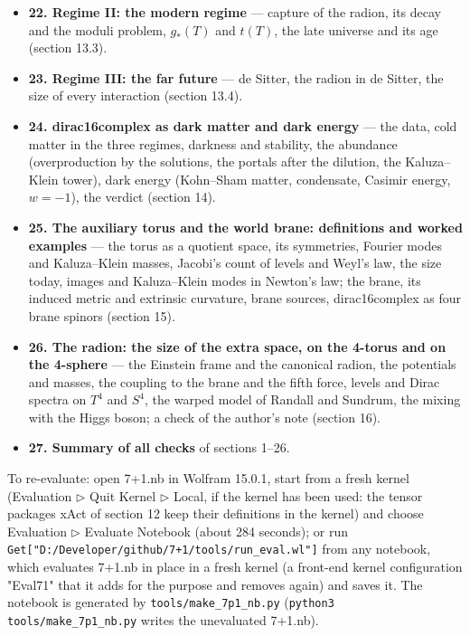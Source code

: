 \documentclass[10pt,a4paper]{article}
\begin{document}
\begin{itemize}
\item \textbf{22. Regime II: the modern regime} — capture of the radion, its decay and the moduli problem, $g_*(T)$ and $t(T)$, the late universe and its age (section 13.3).
\item \textbf{23. Regime III: the far future} — de Sitter, the radion in de Sitter, the size of every interaction (section 13.4).
\item \textbf{24. dirac16complex as dark matter and dark energy} — the data, cold matter in the three regimes, darkness and stability, the abundance (overproduction by the solutions, the portals after the dilution, the Kaluza–Klein tower), dark energy (Kohn–Sham matter, condensate, Casimir energy, $w=-1$), the verdict (section 14).
\item \textbf{25. The auxiliary torus and the world brane: definitions and worked examples} — the torus as a quotient space, its symmetries, Fourier modes and Kaluza–Klein masses, Jacobi’s count of levels and Weyl’s law, the size today, images and Kaluza–Klein modes in Newton’s law; the brane, its induced metric and extrinsic curvature, brane sources, dirac16complex as four brane spinors (section 15).
\item \textbf{26. The radion: the size of the extra space, on the 4-torus and on the 4-sphere} — the Einstein frame and the canonical radion, the potentials and masses, the coupling to the brane and the fifth force, levels and Dirac spectra on $T^4$ and $S^4$, the warped model of Randall and Sundrum, the mixing with the Higgs boson; a check of the author’s note (section 16).
\item \textbf{27. Summary of all checks} of sections 1–26.
\end{itemize}
To re-evaluate: open 7+1.nb in Wolfram 15.0.1, start from a fresh kernel (Evaluation \texorpdfstring{\ensuremath{\triangleright}}{▸} Quit Kernel \texorpdfstring{\ensuremath{\triangleright}}{▸} Local, if the kernel has been used: the tensor packages xAct of section 12 keep their definitions in the kernel) and choose Evaluation \texorpdfstring{\ensuremath{\triangleright}}{▸} Evaluate Notebook (about 284 seconds); or run \texttt{Get["D:/\allowbreak{}Developer/\allowbreak{}github/\allowbreak{}7+1/\allowbreak{}tools/\allowbreak{}run\_\allowbreak{}eval.wl"]} from any notebook, which evaluates 7+1.nb in place in a fresh kernel (a front-end kernel configuration "Eval71" that it adds for the purpose and removes again) and saves it. The notebook is generated by \texttt{tools/\allowbreak{}make\_\allowbreak{}7p1\_\allowbreak{}nb.py} (\texttt{python3 tools/\allowbreak{}make\_\allowbreak{}7p1\_\allowbreak{}nb.py} writes the unevaluated 7+1.nb).
\end{document}
